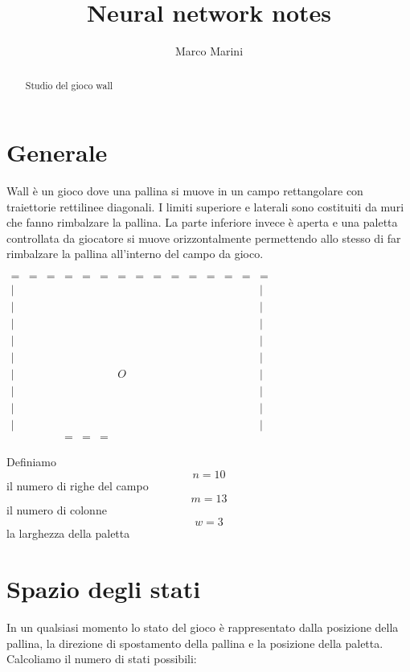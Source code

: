 \documentclass[a4paper,11pt]{article}
\title{Neural network notes}
\author{Marco Marini}
\begin{document}
\maketitle
\tableofcontents

\begin{abstract}
Studio del gioco wall
\end{abstract}

\section{Generale}

Wall è un gioco dove una pallina si muove in un campo rettangolare con traiettorie rettilinee diagonali.
I limiti superiore e laterali sono costituiti da muri che
fanno rimbalzare la pallina.
La parte inferiore invece è aperta e una paletta controllata
da giocatore si muove orizzontalmente permettendo allo stesso di far rimbalzare la pallina all'interno del campo da 
gioco.

$
\begin{array}{ccccccccccccccc}
=	& = & = & = & = & = & = & = & = & = & = & = & = & = & = \\
|	&  &  &  &  &  &  &  &  &  &  &  &  &  & | \\ 
|	&  &  &  &  &  &  &  &  &  &  &  &  &  & | \\ 
|	&  &  &  &  &  &  &  &  &  &  &  &  &  & | \\ 
|	&  &  &  &  &  &  &  &  &  &  &  &  &  & | \\ 
|	&  &  &  &  &  &  &  &  &  &  &  &  &  & | \\ 
|	&  &  &  &  &  & O &  &  &  &  &  &  &  & | \\ 
|	&  &  &  &  &  &  &  &  &  &  &  &  &  & | \\ 
|	&  &  &  &  &  &  &  &  &  &  &  &  &  & | \\ 
|	&  &  &  &  &  &  &  &  &  &  &  &  &  & | \\ 
	&  &  & = & = & = &  &  &  &  &  &  &  &  & 
\end{array} 
$

Definiamo 
\[ n = 10 \] il numero di righe del campo
\[ m = 13 \] il numero di colonne
\[ w = 3 \] la larghezza della paletta


\section{Spazio degli stati}
In un qualsiasi momento lo stato del gioco è rappresentato dalla posizione
della pallina, la direzione di spostamento della pallina e la posizione della paletta.
Calcoliamo il numero di stati possibili:
\end{document}
